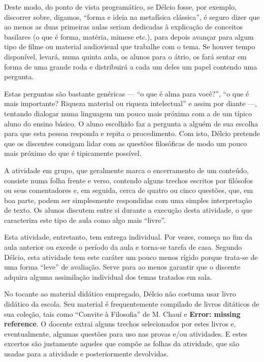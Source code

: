 \documentclass[12pt,a4paper]{article}
\begin{document}
    Deste modo, do ponto de vista programático, se Délcio fosse, por exemplo, 
    discorrer sobre, digamos, ``forma e ideia na metafísica clássica'', 
    é seguro dizer que ao menos as duas primeiras aulas seriam dedicadas à 
    explicação de conceitos basilares (o que é forma, matéria, mimese etc.), 
    para depois avançar para algum tipo de filme ou material audiovisual 
    que trabalhe com o tema. Se houver tempo disponível, levará, numa quinta 
    aula, os alunos para o átrio, os fará sentar em forma de uma grande roda 
    e distribuirá a cada um deles um papel contendo uma pergunta. 
    
    Estas perguntas são bastante genéricas --- ``o que é alma para você?'', 
    ``o que é mais importante? Riqueza material ou riqueza intelectual'' e 
    assim por diante ---, tentando dialogar numa linguagem um pouco mais 
    próxima com a de um típico aluno do ensino básico. O aluno escolhido faz 
    a pergunta a alguém de sua escolha para que esta pessoa responda e repita 
    o procedimento. Com isto, Délcio pretende que os discentes consigam lidar 
    com as questões filosóficas de modo um pouco mais próximo do que 
    é tipicamente possível. 
    
    A atividade em grupo, que geralmente marca o encerramento de um conteúdo, 
    consiste numa folha frente e verso, contendo alguns trechos escritos por 
    filósofos ou seus comentadores e, em seguida, cerca de quatro ou cinco 
    questões, que, em boa parte, podem ser simplesmente respondidas com 
    uma simples interpretação de texto. Os alunos discutem entre si durante 
    a execução desta atividade, o que caracteriza este tipo de aula como algo 
    mais ``livre''. 
    
    Esta atividade, entretanto, tem entrega individual. Por vezes, começa no 
    fim da aula anterior ou excede o período da aula e torna-se tarefa de casa. 
    Segundo Délcio, esta atividade tem este caráter um pouco menos rígido 
    porque trata-se de uma forma ``leve'' de avaliação. Serve para ao menos 
    garantir que o discente adquira alguma assimilação individual dos temas 
    tratados em sala. 
    
    No tocante ao material didático empregado, Délcio não costuma usar livro 
    didático da escola. Seu material é frequentemente compilado de livros 
    ditáticos de sua coleção, tais como ``Convite à Filosofia'' de M. Chauí e 
    \textbf{Error: missing reference}. O docente extrai alguns trechos 
    selecionados por estes livros e, eventualmente, algumas questões para uso 
    nas provas e/ou atividades. E estes excertos são justamente aqueles que 
    compõe as folhas da atividade, que são usadas para a atividade e 
    posteriormente devolvidas. 
    
\end{document}
